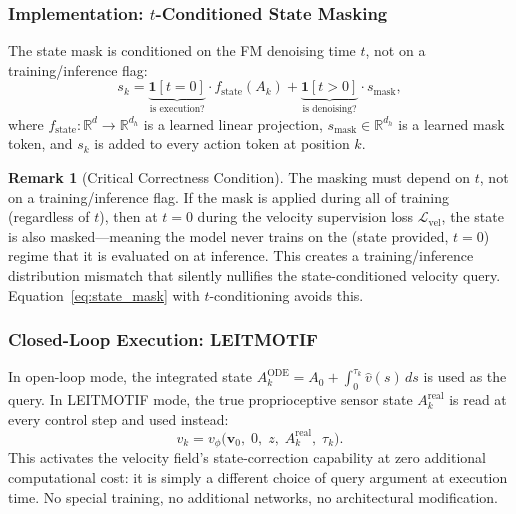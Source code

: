 \documentclass[11pt]{article}
\theoremstyle{plain}
\theoremstyle{definition}
\newtheorem{remark}[theorem]{Remark}
\newcommand{\R}{\mathbb{R}}
\newcommand{\cL}{\mathcal{L}}
\newcommand{\vnet}{v_\phi}
\newcommand{\tdiff}{t}
\newcommand{\texec}{\tau}
\newcommand{\bz}{z}
\newcommand{\chunk}{\mathbf{v}}
\newcommand{\chunkclean}{\chunk_0}
\begin{document}
\subsubsection{Implementation: $t$-Conditioned State Masking}

The state mask is conditioned on the FM denoising time $\tdiff$, not on
a training/inference flag:
\begin{equation}
  \label{eq:state_mask}
  s_k = \underbrace{\mathbf{1}[\tdiff = 0]}_{\text{is execution?}}
    \cdot f_{\mathrm{state}}(A_k)
  + \underbrace{\mathbf{1}[\tdiff > 0]}_{\text{is denoising?}}
    \cdot s_{\mathrm{mask}},
\end{equation}
where $f_{\mathrm{state}} : \R^d \to \R^{d_h}$ is a learned linear
projection, $s_{\mathrm{mask}} \in \R^{d_h}$ is a learned mask token,
and $s_k$ is added to every action token at position $k$.

\begin{remark}[Critical Correctness Condition]
The masking must depend on $\tdiff$, not on a training/inference flag.
If the mask is applied during all of training (regardless of $\tdiff$),
then at $\tdiff = 0$ during the velocity supervision loss $\cL_{\mathrm{vel}}$,
the state is also masked---meaning the model never trains on the
(state provided, $t=0$) regime that it is evaluated on at inference.
This creates a training/inference distribution mismatch that silently
nullifies the state-conditioned velocity query.
Equation~\eqref{eq:state_mask} with $\tdiff$-conditioning avoids this.
\end{remark}

\subsubsection{Closed-Loop Execution: LEITMOTIF}

In open-loop mode, the integrated state $A_k^{\mathrm{ODE}} = A_0 + \int_0^{\texec_k} \hat{v}(s)\,ds$
is used as the query.
In LEITMOTIF mode, the true proprioceptive sensor state $A_k^{\mathrm{real}}$ is read at every
control step and used instead:
\begin{equation}
  v_k = \vnet\!\bigl(\chunkclean,\; 0,\; \bz,\; A_k^{\mathrm{real}},\; \texec_k\bigr).
\end{equation}
This activates the velocity field's state-correction capability at zero
additional computational cost: it is simply a different choice of query
argument at execution time.
No special training, no additional networks, no architectural modification.
\end{document}
